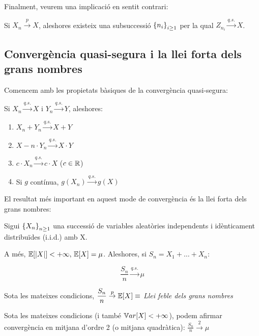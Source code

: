 Finalment, veurem una implicació en sentit contrari:

\begin{prop}
  Si $X_n \overset{p}{\to} X$, aleshores existeix una subsuccessió $\left\{n_i\right\}_{i\geq 1}$ per 
  la qual $Z_{n_i}\overset{q.s.}{\longrightarrow} X$.
\end{prop}

\newpage

\subsection{Convergència quasi-segura i la llei forta dels grans nombres}

Comencem amb les propietats bàsiques de la convergència quasi-segura:

\begin{prop}
  Si $X_n \overset{q.s.}{\to} X$ i $Y_n \overset{q.s.}{\to} Y$, aleshores:
  \begin{enumerate}[label=\alph*)]
    \item $X_n + Y_n \overset{q.s.}{\longrightarrow} X+Y$
    \item $X-n \cdot Y_n \overset{q.s.}{\longrightarrow} X \cdot Y$
    \item $c \cdot X_n \overset{q.s.}{\longrightarrow} c \cdot X$ ($c\in \mathbb{R}$)
    \item Si $g$ contínua, $g(X_n) \overset{q.s.}{\longrightarrow} g(X)$
  \end{enumerate}
\end{prop}

El resultat més important en aquest mode de convergència és la llei forta dels grans nombres:

\begin{thm}
  Sigui $\left\{X_n\right\}_{n\geq 1}$ una successió de variables aleatòries independents i 
  idènticament distribuïdes (i.i.d.) amb X.
  
  A més, $\mathbb{E}[\left\vert X \right\vert]<+\infty, \, \mathbb{E}[X] = \mu$. Aleshores, si $S_n = X_1 + \ldots + X_n$:
  
  \[
    \frac{S_n}{n} \overset{q.s.}{\longrightarrow}\mu 
  \]
\end{thm}

\begin{obs}
  Sota les mateixes condicions, $\dfrac{S_n}{n}\overset{p}{\to}\mathbb{E}[X] \equiv$ \textit{Llei feble dels grans nombres}
\end{obs}

\begin{obs}
  Sota les mateixes condicions (i també $\mathbb{V} ar[X]< +\infty$), podem afirmar convergència en 
  mitjana d'ordre 2 (o mitjana quadràtica): $\frac{S_n}{n} \overset{2}{\to}\mu$
\end{obs}

